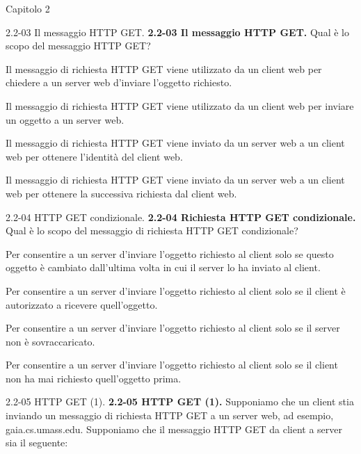 \documentclass[a4paper]{article}
\begin{document}
\begin{quiz}{Capitolo 2}
\begin{multi}[points=1,shuffle]{2.2-03 Il messaggio HTTP GET.}
\textbf{2.2-03 Il messaggio HTTP GET.} Qual è lo scopo del messaggio HTTP GET?
\item* Il messaggio di richiesta HTTP GET viene utilizzato da un client web per chiedere a un server web d'inviare l'oggetto richiesto.
\item Il messaggio di richiesta HTTP GET viene utilizzato da un client web per inviare un oggetto a un server web.
\item Il messaggio di richiesta HTTP GET viene inviato da un server web a un client web per ottenere l'identità del client web.
\item Il messaggio di richiesta HTTP GET viene inviato da un server web a un client web per ottenere la successiva richiesta dal client web.
\end{multi}


\begin{multi}[points=1,shuffle]{2.2-04 HTTP GET condizionale.}
\textbf{2.2-04 Richiesta HTTP GET condizionale.} Qual è lo scopo del messaggio di richiesta HTTP GET condizionale?
\item* Per consentire a un server d'inviare l'oggetto richiesto al client solo se questo oggetto è cambiato dall'ultima volta in cui il server lo ha inviato al client.
\item Per consentire a un server d'inviare l'oggetto richiesto al client solo se il client è autorizzato a ricevere quell'oggetto.
\item Per consentire a un server d'inviare l'oggetto richiesto al client solo se il server non è sovraccaricato.
\item Per consentire a un server d'inviare l'oggetto richiesto al client solo se il client non ha mai richiesto quell'oggetto prima.
\end{multi}

\begin{multi}[points=1,shuffle]{2.2-05 HTTP GET (1).}
\textbf{2.2-05 HTTP GET (1).} 
Supponiamo che un client stia inviando un messaggio di richiesta HTTP GET a un server web, ad esempio, gaia.cs.umass.edu. Supponiamo che il messaggio HTTP GET da client a server sia il seguente:\\

\\


\end{multi}
\end{quiz}
\end{document}
